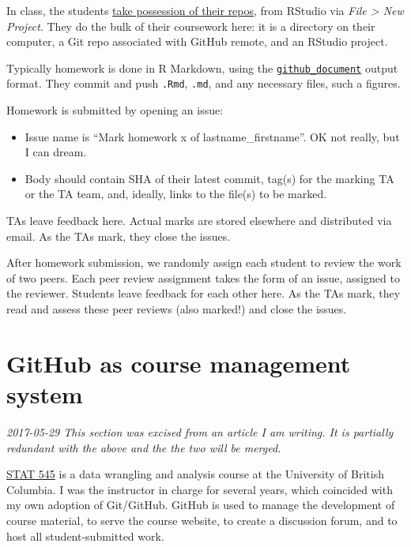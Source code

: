 \documentclass[
]{book}
\providecommand{\tightlist}{%
  \setlength{\itemsep}{0pt}\setlength{\parskip}{0pt}}
\begin{document}
In class, the students \href{http://stat545.com/git08_claim-stat545-repo.html}{take possession of their repos}, from RStudio via \emph{File \textgreater{} New Project}. They do the bulk of their coursework here: it is a directory on their computer, a Git repo associated with GitHub remote, and an RStudio project.

Typically homework is done in R Markdown, using the \href{http://rmarkdown.rstudio.com/github_document_format.html}{\texttt{github\_document}} output format. They commit and push \texttt{.Rmd}, \texttt{.md}, and any necessary files, such a figures.

Homework is submitted by opening an issue:

\begin{itemize}
\tightlist
\item
  Issue name is ``Mark homework x of lastname\_firstname''. OK not really, but I can dream.
\item
  Body should contain SHA of their latest commit, tag(s) for the marking TA or the TA team, and, ideally, links to the file(s) to be marked.
\end{itemize}

TAs leave feedback here. Actual marks are stored elsewhere and distributed via email. As the TAs mark, they close the issues.

After homework submission, we randomly assign each student to review the work of two peers. Each peer review assignment takes the form of an issue, assigned to the reviewer. Students leave feedback for each other here. As the TAs mark, they read and assess these peer reviews (also marked!) and close the issues.

\section{GitHub as course management system}\label{github-as-course-management-system}

\emph{2017-05-29 This section was excised from an article I am writing. It is partially redundant with the above and the the two will be merged.}

\href{http://stat545.com}{STAT 545} is a data wrangling and analysis course at the University of British Columbia. I was the instructor in charge for several years, which coincided with my own adoption of Git/GitHub. GitHub is used to manage the development of course material, to serve the course website, to create a discussion forum, and to host all student-submitted work.
\end{document}
